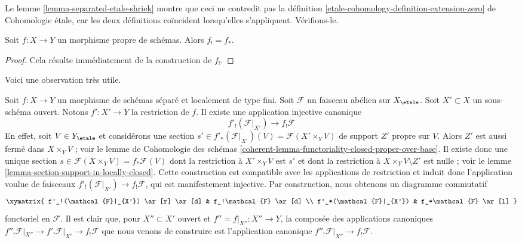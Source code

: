 \noindent
Le lemme \ref{lemma-separated-etale-shriek} montre que ceci ne contredit pas la
définition \ref{etale-cohomology-definition-extension-zero} de Cohomologie étale,
car les deux définitions coïncident lorsqu'elles s'appliquent. Vérifions-le.

\begin{lemma}
\label{lemma-proper-f-shriek}
Soit $f : X \to Y$ un morphisme propre de schémas.
Alors $f_! = f_*$.
\end{lemma}

\begin{proof}
Cela résulte immédiatement de la construction de $f_!$.
\end{proof}

\noindent
Voici une observation très utile.

\begin{remark}
\label{remark-covariance-f-shriek-separated}
Soit $f : X \to Y$ un morphisme de schémas séparé et
localement de type fini. Soit $\mathcal{F}$ un faisceau abélien sur $X_\etale$.
Soit $X' \subset X$ un sous-schéma ouvert. Notons $f' : X' \to Y$
la restriction de $f$. Il existe une application injective canonique
$$
f'_!(\mathcal{F}|_{X'}) \longrightarrow f_!\mathcal{F}
$$
En effet, soit $V \in Y_\etale$ et considérons une section
$s' \in f'_*(\mathcal{F}|_{X'})(V) = \mathcal{F}(X' \times_Y V)$
de support $Z'$ propre sur $V$. Alors $Z'$ est aussi fermé dans $X \times_Y V$ ;
voir le lemme de Cohomologie des schémas
\ref{coherent-lemma-functoriality-closed-proper-over-base}.
Il existe donc une unique section
$s \in \mathcal{F}(X \times_Y V) = f_*\mathcal{F}(V)$
dont la restriction à $X' \times_Y V$ est $s'$ et dont la restriction
à $X \times_Y V \setminus Z'$ est nulle ; voir le
lemme \ref{lemma-section-support-in-locally-closed}. Cette construction est
compatible avec les applications de restriction et induit donc l'application voulue
de faisceaux $f'_!(\mathcal{F}|_{X'}) \to f_!\mathcal{F}$, qui est manifestement
injective. Par construction, nous obtenons un diagramme commutatif
$$
\xymatrix{
f'_!(\mathcal{F}|_{X'}) \ar[r] \ar[d] &
f_!\mathcal{F} \ar[d] \\
f'_*(\mathcal{F}|_{X'}) &
f_*\mathcal{F} \ar[l]
}
$$
fonctoriel en $\mathcal{F}$. Il est clair que, pour $X'' \subset X'$ ouvert
et $f'' = f|_{X''} : X'' \to Y$, la composée des applications canoniques
$f''_!\mathcal{F}|_{X''} \to f'_!\mathcal{F}|_{X'} \to f_!\mathcal{F}$
que nous venons de construire est l'application canonique
$f''_!\mathcal{F}|_{X''} \to f_!\mathcal{F}$.
\end{remark}

